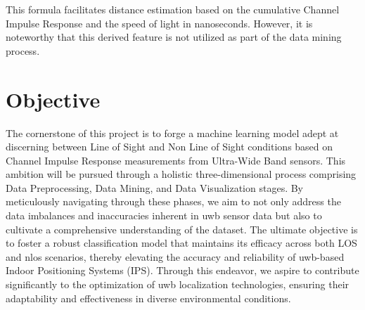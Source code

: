 This formula facilitates distance estimation based on the cumulative Channel Impulse Response and the speed of light in nanoseconds. However, it is noteworthy that this derived feature is not utilized as part of the data mining process.


\section{Objective}\label{objective}
The cornerstone of this project is to forge a machine learning model adept at discerning between \Gls{Line of Sight} and \Gls{Non Line of Sight} conditions based on \Gls{Channel Impulse Response} measurements from \Gls{Ultra-Wide Band} sensors. This ambition will be pursued through a holistic three-dimensional process comprising Data Preprocessing, Data Mining, and Data Visualization stages. By meticulously navigating through these phases, we aim to not only address the data imbalances and inaccuracies inherent in \acrshort{uwb} sensor data but also to cultivate a comprehensive understanding of the dataset. The ultimate objective is to foster a robust classification model that maintains its efficacy across both LOS and \acrshort{nlos} scenarios, thereby elevating the accuracy and reliability of \acrshort{uwb}-based Indoor Positioning Systems (IPS). Through this endeavor, we aspire to contribute significantly to the optimization of \acrshort{uwb} localization technologies, ensuring their adaptability and effectiveness in diverse environmental conditions.




